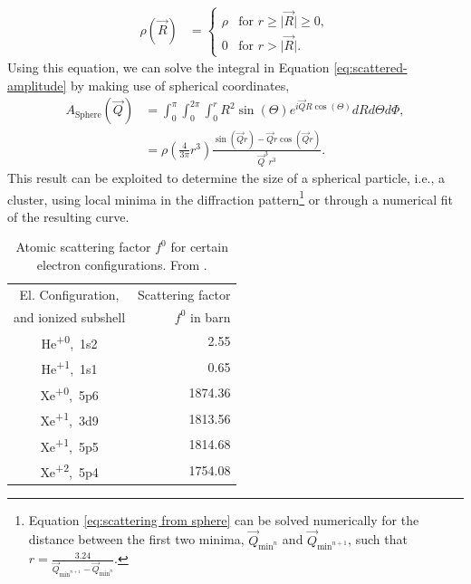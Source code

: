 \begin{align}
\rho\left(\vec{R}\right)&=\begin{cases}
\rho& \text{for $r \geq \lvert\vec{R}\rvert \geq 0$},\\
0&\text{for $r > \lvert\vec{R}\rvert$}.
\end{cases}
\label{eq:el-density}
\end{align}
Using this equation, we can solve the integral in Equation \eqref{eq:scattered-amplitude} by making use of spherical coordinates,
\begin{align}
A_{\text{Sphere}}\left(\vec{Q}\right) &= \int_{0}^{\pi}\int_{0}^{2\pi}\int_{0}^{r} R^{2}  \sin\left(\Theta\right) e^{i \vec{Q} R \cos\left(\Theta\right)} dR d\Theta d\Phi,\\
&=\rho\left(\frac{4}{3\pi}r^{3}\right)\frac{\sin\left(\vec{Q} r\right)-\vec{Q} r\cos\left(\vec{Q} r\right)}{\vec{Q}^{3} r^{3}}.
\label{eq:scattering from sphere}
\end{align}
This result can be exploited to determine the size of a spherical particle, i.e., a cluster, using local minima in the diffraction pattern\footnote{Equation \eqref{eq:scattering from sphere} can be solved numerically for the distance between the first two minima, $\vec{Q}_{\text{min}^{n}}$ and $\vec{Q}_{\text{min}^{n+1}}$, such that $r=\frac{3.24}{\vec{Q}_{\text{min}^{n+1}}-\vec{Q}_{\text{min}^{n}}}$.} or through a numerical fit of the resulting curve.\\[1\baselineskip]
%
\begin{table}
	\centering
		\begin{tabular}{ | c | r | }
		\hline
			El. Configuration, & Scattering factor \\
			and ionized subshell & $f^{0}$ in barn \\ \hline
			He\textsuperscript{+0},\ 1s2 & 2.55  \\ \hline
			He\textsuperscript{+1},\ 1s1 & 0.65  \\ \hline
			Xe\textsuperscript{+0},\ 5p6 & 1874.36  \\ \hline
			Xe\textsuperscript{+1},\ 3d9 & 1813.56  \\ \hline
			Xe\textsuperscript{+1},\ 5p5 & 1814.68  \\ \hline
			Xe\textsuperscript{+2},\ 5p4 & 1754.08  \\ \hline
		\end{tabular}
	\caption[Atomic scattering factors for helium and xenon.]{Atomic scattering factor $f^{0}$ for certain electron configurations. From \citep{Ho-2016-PC}.}
	\label{tab:helium-xenon-el-scattering-crossection}
\end{table}
